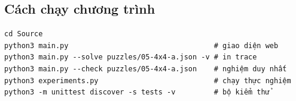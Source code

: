 \documentclass{article}
\begin{document}
\subsection{Cách chạy chương trình}
\begin{Verbatim}[fontsize=\small]
cd Source
python3 main.py                                  # giao diện web
python3 main.py --solve puzzles/05-4x4-a.json -v # in trace
python3 main.py --check puzzles/05-4x4-a.json    # nghiệm duy nhất
python3 experiments.py                           # chạy thực nghiệm
python3 -m unittest discover -s tests -v         # bộ kiểm thử
\end{Verbatim}
\end{document}
